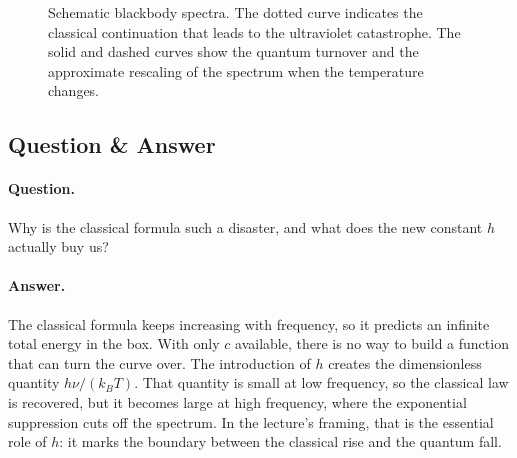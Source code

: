 \begin{figure}[t]
\centering
{}
\caption{Schematic blackbody spectra. The dotted curve indicates the classical continuation that leads to the ultraviolet catastrophe. The solid and dashed curves show the quantum turnover and the approximate rescaling of the spectrum when the temperature changes.}
\end{figure}

\subsection{Question \& Answer}

\paragraph{Question.} Why is the classical formula such a disaster, and what does the new constant \(h\) actually buy us?

\paragraph{Answer.} The classical formula keeps increasing with frequency, so it predicts an infinite total energy in the box. With only \(c\) available, there is no way to build a function that can turn the curve over. The introduction of \(h\) creates the dimensionless quantity \(h\nu/(k_B T)\). That quantity is small at low frequency, so the classical law is recovered, but it becomes large at high frequency, where the exponential suppression cuts off the spectrum. In the lecture's framing, that is the essential role of \(h\): it marks the boundary between the classical rise and the quantum fall.

